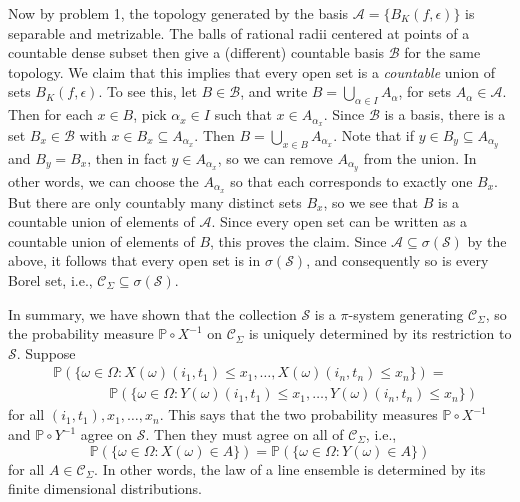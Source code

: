 \documentclass[12pt]{article}
\begin{document}
		Now by problem 1, the topology generated by the basis $\mathcal{A} = \{B_K(f,\epsilon)\}$ is separable and metrizable. The balls of rational radii centered at points of a countable dense subset then give a (different) countable basis $\mathcal{B}$ for the same topology. We claim that this implies that every open set is a \textit{countable} union of sets $B_K(f,\epsilon)$. To see this, let $B\in\mathcal{B}$, and write $B=\bigcup_{\alpha\in I} A_\alpha$, for sets $A_\alpha\in\mathcal{A}$. Then for each $x\in B$, pick $\alpha_x \in I$ such that $x\in A_{\alpha_x}$. Since $\mathcal{B}$ is a basis, there is a set $B_x \in \mathcal{B}$ with $x\in B_x\subseteq A_{\alpha_x}$. Then $B = \bigcup_{x\in B} A_{\alpha_x}$. Note that if $y\in B_y \subseteq A_{\alpha_y}$ and $B_y=B_x$, then in fact $y\in A_{\alpha_x}$, so we can remove $A_{\alpha_y}$ from the union. In other words, we can choose the $A_{\alpha_x}$ so that each corresponds to exactly one $B_x$. But there are only countably many distinct sets $B_x$, so we see that $B$ is a countable union of elements of $\mathcal{A}$. Since every open set can be written as a countable union of elements of $B$, this proves the claim. Since $\mathcal{A}\subseteq\sigma(\mathcal{S})$ by the above, it follows that every open set is in $\sigma(\mathcal{S})$, and consequently so is every Borel set, i.e., $\mathcal{C}_\Sigma \subseteq \sigma(\mathcal{S})$.
		
		In summary, we have shown that the collection $\mathcal{S}$ is a $\pi$-system generating $\mathcal{C}_\Sigma$, so the probability measure $\mathbb{P}\circ X^{-1}$ on $\mathcal{C}_\Sigma$ is uniquely determined by its restriction to $\mathcal{S}$. Suppose
		\begin{align*}
		&\mathbb{P}\left(\{\omega\in\Omega : X(\omega)(i_1,t_1)\leq x_1,\dots,X(\omega)(i_n,t_n)\leq x_n\}\right) =\\
		&\qquad\qquad \mathbb{P}\left(\{\omega\in\Omega : Y(\omega)(i_1,t_1)\leq x_1,\dots,Y(\omega)(i_n,t_n)\leq x_n\}\right)
		\end{align*}
		for all $(i_1,t_1), x_1,\dots,x_n$. This says that the two probability measures $\mathbb{P}\circ X^{-1}$ and $\mathbb{P}\circ Y^{-1}$ agree on $\mathcal{S}$. Then they must agree on all of $\mathcal{C}_\Sigma$, i.e.,
		\[
		\mathbb{P}\left(\{\omega\in\Omega : X(\omega)\in A\}\right) = \mathbb{P}\left(\{\omega\in\Omega : Y(\omega)\in A\}\right)
		\]
		for all $A\in\mathcal{C}_\Sigma$. In other words, the law of a line ensemble is determined by its finite dimensional distributions.
		
\end{document}
